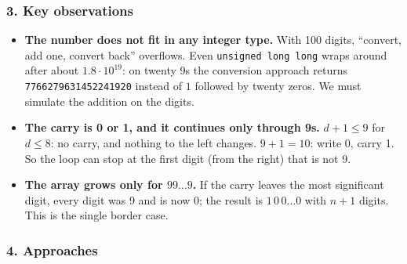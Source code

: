 \begin{diagrambox}
\end{diagrambox}

\subsubsection*{3. Key observations}

\begin{itemize}[leftmargin=*]
    \item \textbf{The number does not fit in any integer type.} With 100 digits, ``convert, add one, convert back'' overflows. Even \texttt{unsigned long long} wraps around after about $1.8 \cdot 10^{19}$: on twenty 9s the conversion approach returns \texttt{7766279631452241920} instead of $1$ followed by twenty zeros. We must simulate the addition on the digits.
    \item \textbf{The carry is 0 or 1, and it continues only through 9s.} $d + 1 \le 9$ for $d \le 8$: no carry, and nothing to the left changes. $9 + 1 = 10$: write 0, carry 1. So the loop can stop at the first digit (from the right) that is not 9.
    \item \textbf{The array grows only for $99\ldots9$.} If the carry leaves the most significant digit, every digit was 9 and is now 0; the result is $1\,0\,0 \ldots 0$ with $n+1$ digits. This is the single border case.
\end{itemize}

\subsubsection*{4. Approaches}

